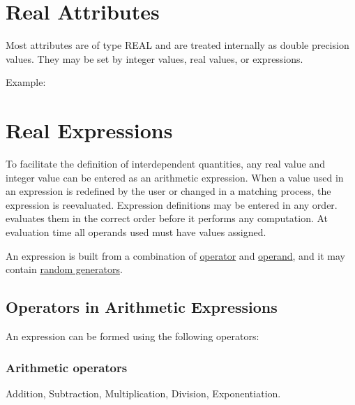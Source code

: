 \section{Real Attributes}
\label{sec:real}
Most attributes are of type REAL and are treated internally as double
precision values. They may be set by integer values, real values,  or
expressions. 

Example:  


%
\section{Real Expressions}
\label{sec:expression}
To facilitate the definition of interdependent quantities, any real
value and integer value can be entered as an arithmetic expression. When
a value used in an expression is redefined by the user or changed in a
matching process, the expression is reevaluated. Expression definitions
may be entered in any order. \madx evaluates them in the correct order
before it performs any computation. At evaluation time all operands used
must have values assigned.  

An expression is built from a combination of
\hyperlink{operator}{operator} and \hyperlink{operand}{operand}, and it
may contain \hyperlink{random}{random generators}.   

\subsection{Operators in Arithmetic Expressions}
\label{subsec:operator}
An expression can be formed using the following operators: 

\subsubsection{Arithmetic operators}
\begin{madlist}
  \ttitem{+} Addition, 
  \ttitem{-} Subtraction, 
  \ttitem{*} Multiplication, 
  \ttitem{/} Division, 
  \ttitem{\^\ } Exponentiation. 
\end{madlist}

